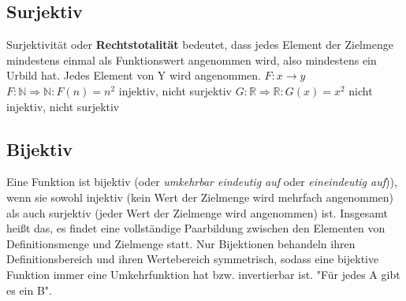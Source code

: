 \documentclass[a4paper,DIV10,12pt,headsepline,smallheadings,halfparskip-]{scrreprt}
\begin{document}
	\subsection{Surjektiv}
	Surjektivität oder \textbf{Rechtstotalität} bedeutet, dass jedes
        Element der Zielmenge mindestens einmal als Funktionswert angenommen
        wird, also mindestens ein Urbild hat. Jedes Element von Y wird
        angenommen.
	\(F: x \rightarrow y\) \newline
	\(F: \mathbb{N} \Rightarrow \mathbb{N}: F(n) = n^2 \) injektiv, nicht surjektiv\newline
	\(G: \mathbb{R} \Rightarrow \mathbb{R}: G(x) = x^2 \) nicht injektiv, nicht surjektiv\newline
	
	\subsection{Bijektiv}
	Eine Funktion ist bijektiv (oder \emph{umkehrbar eindeutig auf} oder
        \emph{eineindeutig auf})), wenn sie sowohl injektiv (kein Wert der
        Zielmenge wird mehrfach angenommen) als auch surjektiv (jeder Wert der
        Zielmenge wird angenommen) ist. Insgesamt heißt das, es findet eine
        vollständige Paarbildung zwischen den Elementen von Definitionsmenge
        und Zielmenge statt. Nur Bijektionen behandeln ihren Definitionsbereich
        und ihren Wertebereich symmetrisch, sodass eine bijektive Funktion
        immer eine Umkehrfunktion hat bzw. invertierbar ist. "Für jedes A gibt
        es ein B".
\end{document}
